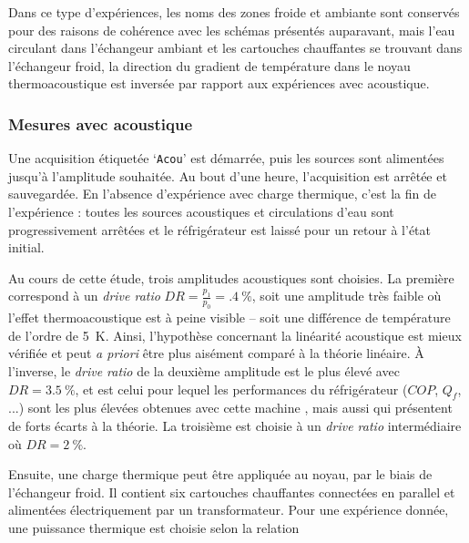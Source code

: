 Dans ce type d'expériences, les noms des zones \og froide \fg{} et \og ambiante \fg{} sont conservés pour des raisons de cohérence avec les schémas présentés auparavant, mais l'eau circulant dans l'échangeur ambiant et les cartouches chauffantes se trouvant dans l'échangeur froid, la direction du gradient de température dans le noyau thermoacoustique est inversée par rapport aux expériences avec acoustique. %


\subsubsection{Mesures avec acoustique}\label{chap:MesureAvecAcou} 
Une acquisition étiquetée `\texttt{Acou}' est démarrée, puis les sources sont alimentées jusqu'à l'amplitude souhaitée. Au bout d'une heure, l'acquisition est arrêtée et sauvegardée. En l'absence d'expérience avec charge thermique, c'est la fin de l'expérience : toutes les sources acoustiques et circulations d'eau sont progressivement arrêtées et le réfrigérateur est laissé pour un retour à l'état initial.

Au cours de cette étude, trois amplitudes acoustiques sont choisies. La première correspond à un \textit{drive ratio} $DR=\frac{p_1}{p_0}=\qty{.4}{\percent}$, soit une amplitude très faible où l'effet thermoacoustique est à peine visible -- soit une différence de température de l'ordre de \qty{5}{\kelvin}. Ainsi, l'hypothèse concernant la linéarité acoustique est mieux vérifiée et peut \textit{a priori} être plus aisément comparé à la théorie linéaire. À l'inverse, le \textit{drive ratio} de la deuxième amplitude est le plus élevé avec $DR=\qty{3.5}{\percent}$, et est celui pour lequel les performances du réfrigérateur ($COP$, $Q_f$, ...) sont les plus élevées obtenues avec cette machine \cite{ramadan_design_2021}, mais aussi qui présentent de forts écarts à la théorie. La troisième est choisie à un \textit{drive ratio} intermédiaire où $DR=\qty{2}{\percent}$. 

Ensuite, une charge thermique peut être appliquée au noyau, par le biais de l'échangeur froid. Il contient six cartouches chauffantes connectées en parallel et alimentées électriquement par un transformateur. Pour une expérience donnée, une puissance thermique est choisie selon la relation

